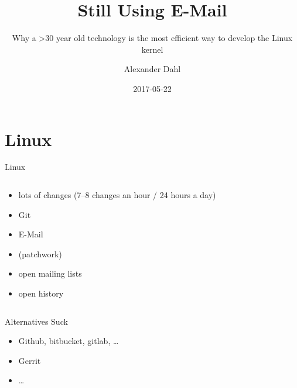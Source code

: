 \documentclass{beamer}
\title{Still Using E-Mail}
\subtitle{Why a >30 year old technology is the most efficient way to develop the Linux kernel}
\author{Alexander Dahl}
\institute[lespocky.de]{\url{http://www.lespocky.de/}}
\date{2017-05-22}
\begin{document}
\begin{frame}
	\titlepage
\end{frame}

%    

\section{Linux}

\begin{frame}{Linux}
    \begin{columns}[T]
        \begin{column}{0.6\textwidth}
            \begin{itemize}
                \item lots of changes (7--8 changes an hour / 24 hours a day)
                \item Git
                \item E-Mail
                \item (patchwork)
                \item open mailing lists
                \item open history
            \end{itemize}
        \end{column}
        \begin{column}{0.4\textwidth}
            
        \end{column}
    \end{columns}
\end{frame}

\begin{frame}{Alternatives Suck}
    \begin{itemize}
        \item Github, bitbucket, gitlab, …
        \item Gerrit
        \item …
    \end{itemize}
\end{frame}
\end{document}
